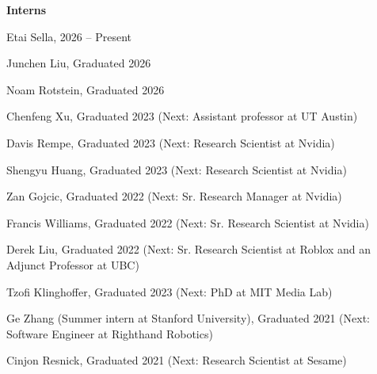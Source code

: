 {\bf Interns}
\begin{list2}
  \item Etai Sella, 2026 -- Present
  \item Junchen Liu, Graduated 2026
  \item Noam Rotstein, Graduated 2026
  \item Chenfeng Xu, Graduated 2023 (Next: Assistant professor at UT Austin)
  \item Davis Rempe, Graduated 2023 (Next: Research Scientist at Nvidia)
  \item Shengyu Huang, Graduated 2023 (Next: Research Scientist at Nvidia)
  \item Zan Gojcic, Graduated 2022 (Next: Sr. Research Manager at Nvidia)
  \item Francis Williams, Graduated 2022 (Next: Sr. Research Scientist at Nvidia)
  \item Derek Liu, Graduated 2022 (Next: Sr. Research Scientist at Roblox and an Adjunct Professor at UBC)
  \item Tzofi Klinghoffer, Graduated 2023 (Next: PhD at MIT Media Lab)
  \item Ge Zhang (Summer intern at Stanford University), Graduated 2021 (Next: Software Engineer at Righthand Robotics)
  \item Cinjon Resnick, Graduated 2021 (Next: Research Scientist at Sesame)
\end{list2}
\vspace*{.05in}
